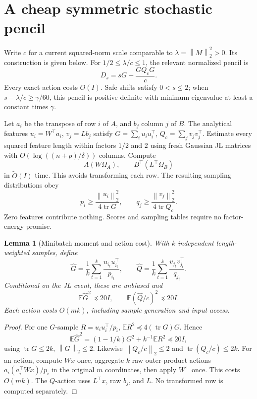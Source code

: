 \documentclass[11pt]{article}
\newtheorem{lemma}[theorem]{Lemma}
\newcommand{\norm}[1]{\left\lVert#1\right\rVert}
\newcommand{\tr}{\operatorname{tr}}
\begin{document}
\section{A cheap symmetric stochastic pencil}
Write \(c\) for a current squared-norm scale comparable to
\(\lambda=\norm{M}_2^2>0\). Its construction is given below.
For \(1/2\leq\lambda/c\leq1\), the relevant normalized pencil is
\[
 D_s=sG-\frac{GQ_cG}{c}.
\]
Every exact action costs \(O(I)\). Safe shifts satisfy
\(0<s\leq2\); when \(s-\lambda/c\geq\gamma/60\), this pencil is
positive definite with minimum eigenvalue at least a constant times
\(\gamma\).

Let \(a_i\) be the transpose of row \(i\) of \(A\), and \(b_j\) column
\(j\) of \(B\). The analytical features
\(u_i=W^\top a_i\), \(v_j=Lb_j\) satisfy
\(G=\sum_i u_iu_i^\top\), \(Q_c=\sum_jv_jv_j^\top\).
Estimate every squared feature length within factors \(1/2\) and \(2\)
using fresh Gaussian JL matrices with \(O(\log((n+p)/\delta))\)
columns. Compute
\[
 A(W\Omega_A),\qquad B^\top(L^\top\Omega_B)
\]
in \(\widetilde O(I)\) time. This avoids transforming each row.
The resulting sampling distributions obey
\[
 p_i\geq\frac{\norm{u_i}_2^2}{4\tr G},\qquad
 q_j\geq\frac{\norm{v_j}_2^2}{4\tr Q_c}.
\]
Zero features contribute nothing. Scores and sampling tables require
no factor-energy promise.

\begin{lemma}[Minibatch moment and action cost]\label{lem:sample}
With \(k\) independent length-weighted samples, define
\[
 \widehat G=\frac1k\sum_{t=1}^k
        \frac{u_{i_t}u_{i_t}^\top}{p_{i_t}},\qquad
 \widehat Q=\frac1k\sum_{t=1}^k
        \frac{v_{j_t}v_{j_t}^\top}{q_{j_t}}.
\]
Conditional on the JL event, these are unbiased and
\[
 \mathbb E\widehat G^2\preceq20I,\qquad
 \mathbb E(\widehat Q/c)^2\preceq20I .
\]
Each action costs \(O(mk)\), including sample generation and input access.
\end{lemma}
\begin{proof}
For one \(G\)-sample \(R=u_iu_i^\top/p_i\),
\(\mathbb ER^2\preceq4(\tr G)G\). Hence
\[
 \mathbb E\widehat G^2
 =(1-1/k)G^2+k^{-1}\mathbb ER^2\preceq20I,
\]
using \(\tr G\leq2k\), \(\norm G_2\leq2\).
Likewise \(\norm{Q_c/c}_2\leq2\) and
\(\tr(Q_c/c)\leq2k\).
For an action, compute \(Wx\) once, aggregate \(k\) raw outer-product
actions \(a_i(a_i^\top Wx)/p_i\) in the original \(m\) coordinates,
then apply \(W^\top\) once. This costs \(O(mk)\).
The \(Q\)-action uses \(L^\top x\), raw \(b_j\), and \(L\).
No transformed row is computed separately.
\end{proof}
\end{document}
